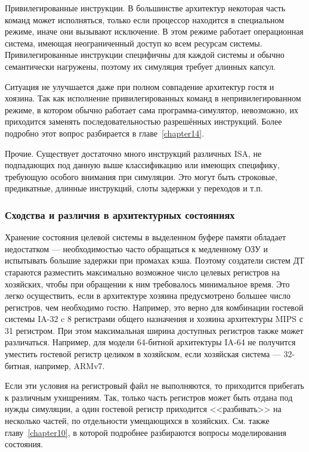 \begin{description*}
    \item[Привилегированные инструкции.] В большинстве архитектур некоторая часть команд может исполняться, только если процессор находится в специальном режиме, иначе они вызывают исключение. В этом режиме работает операционная система, имеющая неограниченный доступ ко всем ресурсам системы. Привилегированные инструкции специфичны для каждой системы и обычно семантически нагружены, поэтому их симуляция требует длинных капсул.
    
    Ситуация не улучшается даже при полном совпадение архитектур гостя и хоязина. Так как исполнение привилегированных команд в непривилегированном режиме, в котором обычно работает сама программа-симулятор, невозможно, их приходится заменять последовательностью разрешённых инструкций. Более подробно этот вопрос разбирается в главе~\ref{chapter14}.

    \item[Прочие.] Существует достаточно много инструкций различных ISA, не подпадающих под данную выше классификацию или имеющих специфику, требующую особого внимания при симуляции. Это могут быть строковые, предикатные, длинные инструкций, слоты задержки у переходов и т.п.
\end{description*}


\subsubsection{Сходства и различия в архитектурных состояниях}

Хранение состояния целевой системы в выделенном буфере памяти обладает недостатком --- необходимостью часто обращаться к медленному ОЗУ и испытывать большие задержки при промахах кэша. Поэтому создатели систем ДТ стараются разместить максимально возможное число целевых регистров на хозяйских, чтобы при обращении к ним требовалось минимальное время. Это легко осуществить, если в архитектуре хозяина предусмотрено большее число регистров, чем необходимо гостю. Например, это верно для комбинации гостевой системы IA-32 c 8 регистрами общего назначения и хозяина архитектуры MIPS с 31 регистром. При этом максимальная ширина доступных регистров также может различаться. Например, для модели 64-битной архитектуры IA-64 не получится уместить гостевой регистр целиком в хозяйском, если хозяйская система --- 32-битная, например, ARMv7.

Если эти условия на регистровый файл не выполняются, то приходится прибегать к различным ухищрениям. Так, только часть регистров может быть отдана под нужды симуляции, а один гостевой регистр приходится <<разбивать>> на несколько частей, по отдельности умещающихся в хозяйских. См. также главу~\ref{chapter10}, в которой подробнее разбираются вопросы моделирования состояния.

